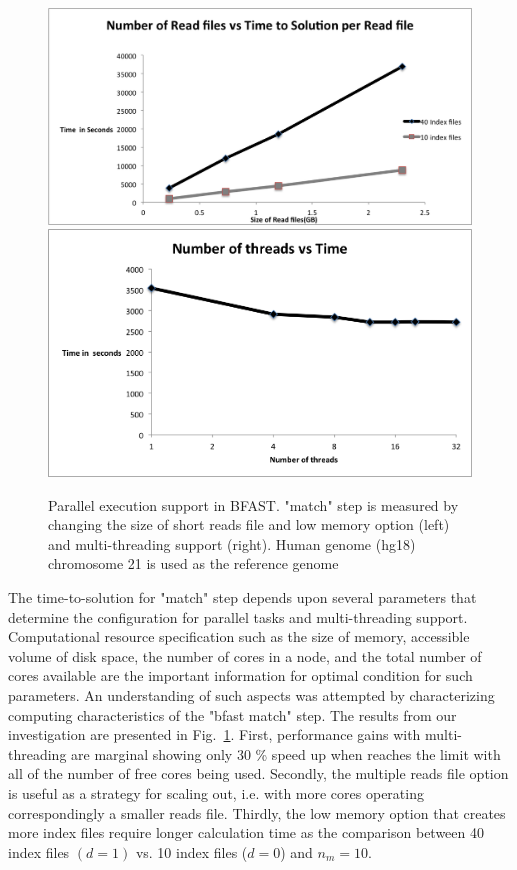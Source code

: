 \documentclass[12pt]{article}
\begin{document}
\begin{figure}
 \centering
\includegraphics[scale=0.43]{figures/readvstime.png}
\includegraphics[scale=0.44]{figures/threadsvstime.png} 

\caption{\small Parallel execution support in BFAST.  "match" step is measured by changing the size of short reads file and low memory option (left) and multi-threading support (right).  Human genome (hg18) chromosome 21 is used as the reference genome}
  \label{fig:parallel-execution} 
 \end{figure}


The time-to-solution for "match" step depends upon several parameters that determine the configuration for parallel tasks and multi-threading support.  Computational resource specification such as the size of memory, accessible volume of disk space, the number of cores in a node, and the total number of cores available are the important information for optimal condition for such parameters.  An understanding of such aspects was attempted by characterizing computing characteristics of the "bfast match" step.  The results from our investigation are presented  in Fig.~\ref{fig:parallel-execution}. First, performance gains with multi-threading are marginal showing only 30 \% speed up when reaches the limit with all of the number of free cores being used.  
Secondly, the multiple reads file option is useful as a strategy for scaling out, i.e. with more cores operating correspondingly a smaller reads file.  Thirdly, the low memory option that creates more index files require longer calculation time as the comparison between 40 index files $(d = 1)$ vs. 10 index files ($ d = 0 $) and $n_m = 10$.   
\end{document}
